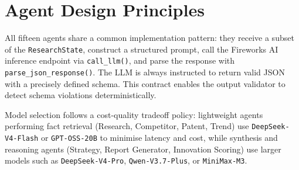 \documentclass[12pt,a4paper,oneside]{book}
\begin{document}
\section{Agent Design Principles}

All fifteen agents share a common implementation pattern: they receive a subset of the \texttt{ResearchState}, construct a structured prompt, call the Fireworks AI inference endpoint via \texttt{call\_llm()}, and parse the response with \texttt{parse\_json\_response()}. The LLM is always instructed to return valid JSON with a precisely defined schema. This contract enables the output validator to detect schema violations deterministically.

Model selection follows a cost-quality tradeoff policy: lightweight agents performing fact retrieval (Research, Competitor, Patent, Trend) use \texttt{DeepSeek-V4-Flash} or \texttt{GPT-OSS-20B} to minimise latency and cost, while synthesis and reasoning agents (Strategy, Report Generator, Innovation Scoring) use larger models such as \texttt{DeepSeek-V4-Pro}, \texttt{Qwen-V3.7-Plus}, or \texttt{MiniMax-M3}.
\end{document}
